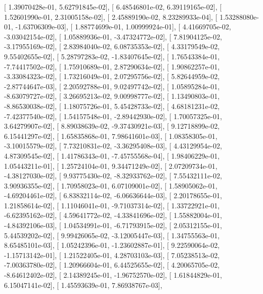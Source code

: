 \documentclass{article}
\begin{document}
       [  1.39070428e-01,   5.62791845e-02],
       [  6.48546801e-02,   6.39119165e-02],
       [  1.52601990e-01,   2.31005158e-02],
       [  2.45889190e-02,   8.23289933e-04],
       [  1.53288080e-01,  -1.63706309e-03],
       [  1.88774699e-01,   1.00999924e-01],
       [  4.41669705e-02,  -3.03042154e-02],
       [  1.05889936e-01,  -3.47324772e-02],
       [  7.81904125e-02,  -3.17955169e-02],
       [  2.83984040e-02,   6.08735353e-02],
       [  4.33179549e-02,   9.55402655e-02],
       [  5.28797283e-02,  -1.83407645e-02],
       [  1.76543384e-01,  -7.74417502e-02],
       [  1.75910689e-01,   2.87290634e-02],
       [  1.90862257e-01,  -3.33084323e-02],
       [  1.73216049e-01,   2.07295756e-02],
       [  5.82644959e-02,  -2.87744647e-03],
       [  2.20592788e-01,   9.02497742e-02],
       [  1.05895284e-01,  -8.63079727e-02],
       [  3.26695213e-02,   9.00998777e-02],
       [  1.13490803e-01,  -8.86530038e-02],
       [  1.18075726e-01,   5.45428733e-02],
       [  4.68181231e-02,  -7.42377540e-02],
       [  1.54157548e-01,  -2.89442930e-02],
       [  1.70057325e-01,   3.64279907e-02],
       [  8.89038639e-02,  -9.37430921e-03],
       [  9.12718899e-02,   6.15441297e-02],
       [  1.65835868e-01,   7.98641601e-03],
       [  1.08358305e-01,  -3.10015579e-02],
       [  7.73210831e-02,  -3.36295408e-03],
       [  4.43129954e-02,   4.87309545e-02],
       [  1.41786343e-01,  -7.45755568e-04],
       [  1.98406229e-01,   1.05443211e-01],
       [  1.25724104e-01,   9.34471249e-02],
       [  2.07209734e-01,  -4.38127030e-02],
       [  9.93775430e-02,  -8.32933762e-02],
       [  7.55432111e-02,   3.90936355e-02],
       [  1.70958023e-01,   6.07109001e-02],
       [  1.58905062e-01,  -4.69204461e-02],
       [  6.83832114e-02,  -6.06636644e-03],
       [  2.20178655e-01,   1.21858614e-02],
       [  1.11046041e-01,  -9.71037314e-02],
       [  1.33722921e-01,  -6.62395162e-02],
       [  4.59641772e-02,  -4.33841696e-02],
       [  1.55882004e-01,  -4.84392106e-03],
       [  1.04534991e-01,  -6.71793915e-02],
       [  2.05312155e-01,   5.44539202e-02],
       [  9.99426065e-02,  -3.12005447e-03],
       [  1.34755563e-01,   8.65485101e-03],
       [  1.05242396e-01,  -1.23602887e-01],
       [  9.22590064e-02,  -1.15713142e-01],
       [  1.21522405e-01,   4.28703103e-03],
       [  7.05238513e-02,  -7.00363780e-02],
       [  1.20966604e-01,   6.44525655e-02],
       [  4.20065705e-02,  -8.64612402e-02],
       [  2.14389245e-01,  -1.96752570e-02],
       [  1.61844829e-01,   6.15047141e-02],
       [  1.45593639e-01,   7.86938767e-03],
\end{document}
